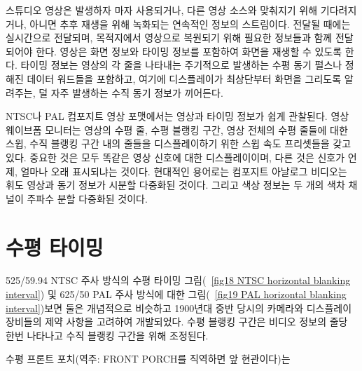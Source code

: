 스튜디오 영상은 발생하자 마자 사용되거나, 다른 영상 소스와 맞춰지기 위해 기다려지거나, 아니면 추후 재생을 위해 녹화되는 연속적인 정보의 스트림이다. 전달될 때에는 실시간으로 전달되며, 목적지에서 영상으로 복원되기 위해 필요한 정보들과 함께 전달되어야 한다.
영상은 화면 정보와 타이밍 정보를 포함하여 화면을 재생할 수 있도록 한다. 타이밍 정보는 영상의 각 줄을 나타내는 주기적으로 발생하는 수평 동기 펄스나 정해진 데이터 워드들을 포함하고, 여기에 디스플레이가 최상단부터 화면을 그리도록 알려주는, 덜 자주 발생하는 수직 동기 정보가 끼어든다.

NTSC나 PAL 컴포지트 영상 포맷에서는 영상과 타이밍 정보가 쉽게 관찰된다. 영상 웨이브폼 모니터는 영상의 수평 줄, 수평 블랭킹 구간, 영상 전체의 수평 줄들에 대한 스윕, 수직 블랭킹 구간 내의 줄들을 디스플레이하기 위한 스윕 속도 프리셋들을 갖고 있다.
중요한 것은 모두 똑같은 영상 신호에 대한 디스플레이이며, 다른 것은 신호가 언제, 얼마나 오래 표시되냐는 것이다. 현대적인 용어로는 컴포지트 아날로그 비디오는 휘도 영상과 동기 정보가 시분할 다중화된 것이다.
그리고 색상 정보는 두 개의 색차 채널이 주파수 분할 다중화된 것이다.

\section{수평 타이밍}
525/59.94 NTSC 주사 방식의 수평 타이밍 그림(\figurename~\ref{fig18 NTSC horizontal blanking interval}) 및 625/50 PAL 주사 방식에 대한 그림(\figurename~\ref{fig19 PAL horizontal blanking interval})\을 보면 둘은 개념적으로 비슷하고 1900년대 중반 당시의 카메라와 디스플레이 장비들의 제약 사항을 고려하여 개발되었다.
수평 블랭킹 구간은 비디오 정보의 줄당 한번 나타나고 수직 블랭킹 구간을 위해 조정된다.

수평 프론트 포치(역주: FRONT PORCH를 직역하면 앞 현관이다)는